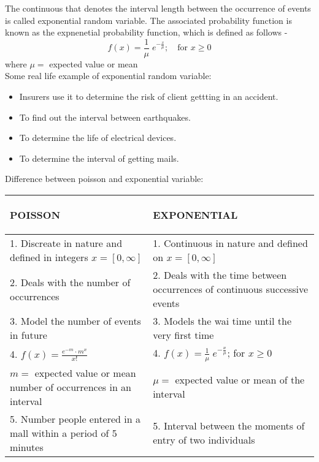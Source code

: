 \documentclass{article}
\begin{document}
\Large{
    The continuous that denotes the interval length between the occurrence of events is called exponential random variable. The associated probability function is known as the expnenetial probability function, which is defined as follows -
    $$f(x) = \frac{1}{\mu}\;e^{-\frac{x}{\mu}};\hspace{1em}\text{for } x\geq 0$$
    where $\mu=$ expected value or mean\\

    Some real life example of exponential random variable:
    \begin{itemize}
        \item Insurers use it to determine the risk of client gettting in an accident.
        \item To find out the interval between earthquakes.
        \item To determine the life of electrical devices.
        \item To determine the interval of getting mails.
    \end{itemize}
    \vspace{1em} 
    Difference between poisson and exponential variable:

    \vspace{1em}
    \renewcommand{\arraystretch}{1.5}
    \setlength{\tabcolsep}{1em}
    \begin{center}
    \begin{tabular}{ |p{7cm}|p{7cm}| }
        \hline
        \begin{center}\textbf{POISSON} \end{center}                                                            & \begin{center}\textbf{EXPONENTIAL}\end{center} \\ \hline
        1. Discreate in nature and defined in integers $x=[0, \infty]$& 1. Continuous in nature and defined on $x=[0, \infty]$\\ \hline
        2. Deals with the number of occurrences     & 2. Deals with the time between occurrences of continuous successive events\\ \hline 
        3. Model the number of events in future & 3. Models the wai time until the very first time\\ \hline
        4. $f(x) = \frac{e^{-m}\cdot m^x}{x!}$  & 4. $f(x) = \frac{1}{\mu}\;e^{-\frac{x}{\mu}}$; for $x \geq 0$ \\ 
        $m=$ expected value or mean number of occurrences in an interval & $\mu=$ expected value or mean of the interval \\ \hline
        5. Number people entered in a mall within a period of 5 minutes & 5. Interval between the moments of entry of two individuals\\ \hline
    \end{tabular}
    \end{center}
    
    
}
\end{document}
